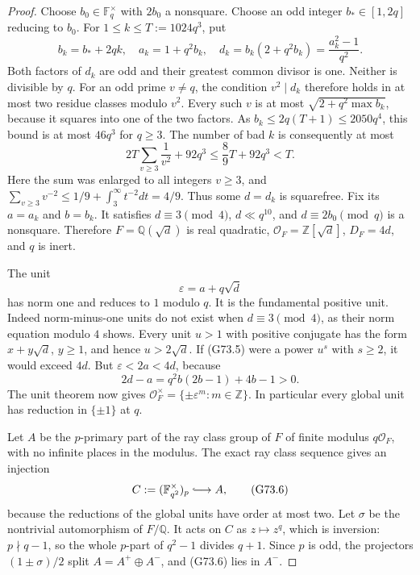 \begin{proof}
Choose $b_0\in\mathbb F_q^\times$ with $2b_0$ a nonsquare.
Choose an odd integer $b_*\in[1,2q]$ reducing to $b_0$.
For $1\le k\le T:=1024q^3$, put
\[
 b_k=b_*+2qk,\quad a_k=1+q^2b_k,\quad
 d_k=b_k(2+q^2b_k)=\frac{a_k^2-1}{q^2}.              \tag{G73.3}
\]
Both factors of $d_k$ are odd and their greatest common
 divisor is one. Neither is divisible by $q$.
For an odd prime $v\ne q$, the condition $v^2\mid d_k$
therefore holds in at most two residue classes modulo $v^2$.
Every such $v$ is at most
$\sqrt{2+q^2\max b_k}$, because it squares into one
of the two factors.
As $b_k\le2q(T+1)\le2050q^4$, this bound is at most
$46q^3$ for $q\ge3$.
The number of bad $k$ is consequently at most
\[
 2T\sum_{v\ge3}\frac1{v^2}+92q^3
 \le\frac89T+92q^3<T.                              \tag{G73.4}
\]
Here the sum was enlarged to all integers $v\ge3$, and
$\sum_{v\ge3}v^{-2}\le1/9+\int_3^\infty t^{-2}dt=4/9$.
Thus some $d=d_k$ is squarefree. Fix its $a=a_k$ and $b=b_k$.
It satisfies $d\equiv3\pmod4$, $d\ll q^{10}$, and
$d\equiv2b_0\pmod q$ is a nonsquare.
Therefore $F=\mathbb Q(\sqrt d)$ is real quadratic,
$\mathcal O_F=\mathbb Z[\sqrt d]$, $D_F=4d$, and $q$ is inert.

The unit
\[
                   \varepsilon=a+q\sqrt d           \tag{G73.5}
\]
has norm one and reduces to $1$ modulo $q$.
It is the fundamental positive unit.
Indeed norm-minus-one units do not exist when $d\equiv3\pmod4$,
as their norm equation modulo $4$ shows.
Every unit $u>1$ with positive conjugate has the form
$x+y\sqrt d$, $y\ge1$, and hence $u>2\sqrt d$.
If (G73.5) were a power $u^s$ with $s\ge2$, it would
exceed $4d$. But $\varepsilon<2a<4d$, because
\[
                  2d-a=q^2b(2b-1)+4b-1>0.
\]
The unit theorem now gives $\mathcal O_F^\times=\{\pm\varepsilon^m:m\in\mathbb Z\}$.
In particular every global unit has reduction in $\{\pm1\}$ at $q$.

Let $A$ be the $p$-primary part of the ray class group of
$F$ of finite modulus $q\mathcal O_F$, with no infinite
places in the modulus. The exact ray class sequence gives
an injection
\[
 C:=(\mathbb F_{q^2}^{\times})_p\lhook\joinrel\longrightarrow A,
                                                        \tag{G73.6}
\]
because the reductions of the global units have order at most two.
Let $\sigma$ be the nontrivial automorphism of $F/\mathbb Q$.
It acts on $C$ as $z\mapsto z^q$, which is inversion:
$p\nmid q-1$, so the whole $p$-part of $q^2-1$ divides $q+1$.
Since $p$ is odd, the projectors $(1\pm\sigma)/2$
split $A=A^+\oplus A^-$, and (G73.6) lies in $A^-$.


\end{proof}
